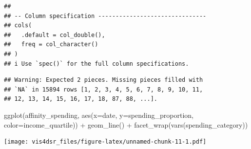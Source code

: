 \documentclass[
]{krantz}
\makeatletter
\newenvironment{Shaded}{\begin{snugshade}}{\end{snugshade}}
\newcommand{\AttributeTok}[1]{\textcolor[rgb]{0.61,0.61,0.61}{#1}}
\newcommand{\FunctionTok}[1]{\textcolor[rgb]{0,0,0}{#1}}
\newcommand{\NormalTok}[1]{#1}
\newcommand{\SpecialCharTok}[1]{\textcolor[rgb]{0,0,0}{#1}}
\newenvironment{kframe}{%
\medskip{}
\setlength{\fboxsep}{.8em}
 \def\at@end@of@kframe{}%
 \ifinner\ifhmode%
  \def\at@end@of@kframe{\end{minipage}}%
  \begin{minipage}{\columnwidth}%
 \fi\fi%
 \def\FrameCommand##1{\hskip\@totalleftmargin \hskip-\fboxsep
 \colorbox{shadecolor}{##1}\hskip-\fboxsep
     \hskip-\linewidth \hskip-\@totalleftmargin \hskip\columnwidth}%
 \MakeFramed {\advance\hsize-\width
   \@totalleftmargin\z@ \linewidth\hsize
   \@setminipage}}%
 {\par\unskip\endMakeFramed%
 \at@end@of@kframe}
\renewenvironment{Shaded}{\begin{kframe}}{\end{kframe}}
\makeatother
\begin{document}
\begin{verbatim}
## 
## -- Column specification -------------------------------
## cols(
##   .default = col_double(),
##   freq = col_character()
## )
## i Use `spec()` for the full column specifications.
\end{verbatim}

\begin{verbatim}
## Warning: Expected 2 pieces. Missing pieces filled with
## `NA` in 15894 rows [1, 2, 3, 4, 5, 6, 7, 8, 9, 10, 11,
## 12, 13, 14, 15, 16, 17, 18, 87, 88, ...].
\end{verbatim}

\begin{Shaded}
\begin{Highlighting}[]
\FunctionTok{ggplot}\NormalTok{(affinity\_spending, }\FunctionTok{aes}\NormalTok{(}\AttributeTok{x=}\NormalTok{date, }\AttributeTok{y=}\NormalTok{spending\_proportion, }\AttributeTok{color=}\NormalTok{income\_quartile)) }\SpecialCharTok{+}
  \FunctionTok{geom\_line}\NormalTok{() }\SpecialCharTok{+}
  \FunctionTok{facet\_wrap}\NormalTok{(}\FunctionTok{vars}\NormalTok{(spending\_category))}
\end{Highlighting}
\end{Shaded}

\texttt{[image: vis4dsr\_files/figure-latex/unnamed-chunk-11-1.pdf]}

  

\backmatter
\printindex
\end{document}
